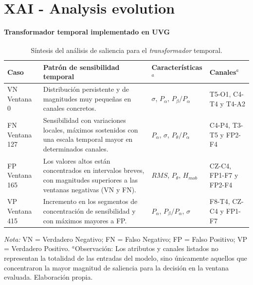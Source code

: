 \chapter{XAI - Analysis evolution}
\subsubsection{Transformador temporal implementado en UVG}
\begin{table}[h!]
    \centering
    \small
    \renewcommand{\arraystretch}{2.0}
    \setlength{\tabcolsep}{4pt}
    \captionsetup{width=0.95\linewidth}
    \caption{Síntesis del análisis de saliencia para el \textit{transformador} temporal.}
    \begin{tabular}{p{2cm} | p{7cm} p{3cm} p{2cm}}
    \hline
    \textbf{Caso}     
    & \textbf{Patrón de sensibilidad temporal}
    & \textbf{Características}$^a$       
    & \textbf{Canales}$^a$\\ \hline
    
    VN \newline Ventana 0 
    & Distribución persistente y de magnitudes muy pequeñas en canales concretos.
    & $\sigma$, $P_{\alpha}$, $P_{\beta}/P_{\alpha}$
    & T5-O1, C4-T4 y T4-A2\\

    FN \newline Ventana 127
    & Sensibilidad con variaciones locales, máximos sostenidos con una escala temporal mayor en determinados canales.
    & $P_{\alpha}$, $\sigma$, $P_{\theta}/P_{\alpha}$
    & C4-P4, T3-T5 y FP2-F4\\

    FP \newline Ventana 165
    & Los valores altos están concentrados en intervalos breves, con magnitudes superiores a las ventanas negativas (VN y FN).
    & $RMS$, $P_{\theta}$, $H_{mob}$
    & CZ-C4, FP1-F7 y FP2-F4\\

    VP \newline Ventana 415
    & Incremento en los segmentos de concentración de sensibilidad y con máximos mayores a FP.
    & $P_{\alpha}$, $P_{\beta}/P_{\alpha}$, $\sigma$
    & F8-T4, CZ-C4 y FP1-F7 \\
    \hline
    \end{tabular}
    \vspace{2mm}
    
    \small \textit{Nota:} VN = Verdadero Negativo; FN = Falso Negativo; FP = Falso Positivo; VP = Verdadero Positivo. 
    $^a$Observación: Los atributos y canales listados no representan la totalidad de las entradas del modelo, sino únicamente aquellos que concentraron la mayor magnitud de saliencia para la decisión en la ventana evaluada. Elaboración propia.
    \label{tab:transformer_temporal_saliencia_resumen}  
\end{table}